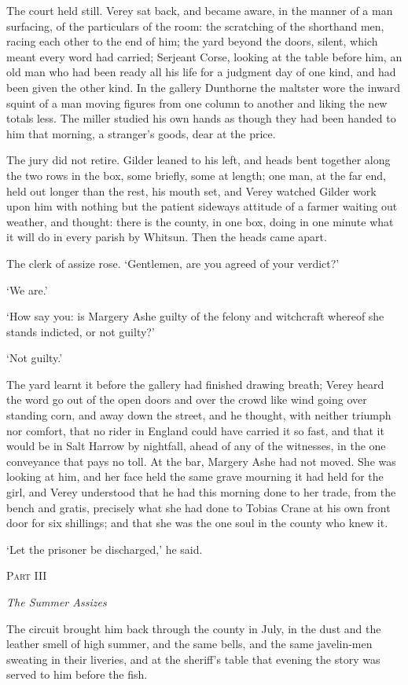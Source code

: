 \documentclass[11pt]{article}
\newcommand{\partheading}[2]{%
  \clearpage
  \vspace*{5\baselineskip}
  {\centering
   {\large\scshape Part #1}\par
   \vspace{0.6\baselineskip}
   {\Large\itshape #2}\par}
  \vspace{2.5\baselineskip}\noindent}
\begin{document}
The court held still. Verey sat back, and became aware, in the manner of a man surfacing, of the particulars of the room: the scratching of the shorthand men, racing each other to the end of him; the yard beyond the doors, silent, which meant every word had carried; Serjeant Corse, looking at the table before him, an old man who had been ready all his life for a judgment day of one kind, and had been given the other kind. In the gallery Dunthorne the maltster wore the inward squint of a man moving figures from one column to another and liking the new totals less. The miller studied his own hands as though they had been handed to him that morning, a stranger's goods, dear at the price.

The jury did not retire. Gilder leaned to his left, and heads bent together along the two rows in the box, some briefly, some at length; one man, at the far end, held out longer than the rest, his mouth set, and Verey watched Gilder work upon him with nothing but the patient sideways attitude of a farmer waiting out weather, and thought: there is the county, in one box, doing in one minute what it will do in every parish by Whitsun. Then the heads came apart.

The clerk of assize rose. `Gentlemen, are you agreed of your verdict?'

`We are.'

`How say you: is Margery Ashe guilty of the felony and witchcraft whereof she stands indicted, or not guilty?'

`Not guilty.'

The yard learnt it before the gallery had finished drawing breath; Verey heard the word go out of the open doors and over the crowd like wind going over standing corn, and away down the street, and he thought, with neither triumph nor comfort, that no rider in England could have carried it so fast, and that it would be in Salt Harrow by nightfall, ahead of any of the witnesses, in the one conveyance that pays no toll. At the bar, Margery Ashe had not moved. She was looking at him, and her face held the same grave mourning it had held for the girl, and Verey understood that he had this morning done to her trade, from the bench and gratis, precisely what she had done to Tobias Crane at his own front door for six shillings; and that she was the one soul in the county who knew it.

`Let the prisoner be discharged,' he said.

\partheading{III}{The Summer Assizes}
\noindent The circuit brought him back through the county in July, in the dust and the leather smell of high summer, and the same bells, and the same javelin-men sweating in their liveries, and at the sheriff's table that evening the story was served to him before the fish.
\end{document}
